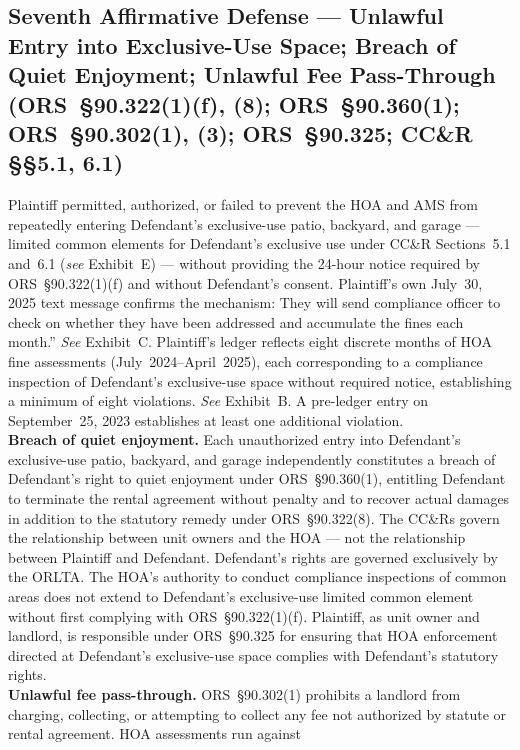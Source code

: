 \documentclass[10pt,letterpaper,oneside]{extarticle}
\begin{document}
\subsection{\textbf{Seventh Affirmative Defense ---
		Unlawful Entry into Exclusive-Use Space;
		Breach of Quiet Enjoyment;
		Unlawful Fee Pass-Through
		(ORS~\S90.322(1)(f), (8); ORS~\S90.360(1);
		ORS~\S90.302(1), (3); ORS~\S90.325;
		CC\&R \S\S5.1, 6.1)}}
Plaintiff permitted, authorized, or failed to prevent the
HOA and AMS from repeatedly entering Defendant's
exclusive-use patio, backyard, and garage --- limited common
elements for Defendant's exclusive use under CC\&R
Sections~5.1 and~6.1 (\textit{see} Exhibit~E) --- without
providing the 24-hour notice required by
ORS~\S90.322(1)(f) and without Defendant's consent.
Plaintiff's own July~30, 2025 text message confirms the
mechanism: They will send compliance officer to check on
whether they have been addressed and accumulate the fines
each month.'' \textit{See} Exhibit~C. Plaintiff's ledger
reflects eight discrete months of HOA fine assessments
(July~2024--April~2025), each corresponding to a compliance
inspection of Defendant's exclusive-use space without
required notice, establishing a minimum of eight violations.
\textit{See} Exhibit~B. A pre-ledger entry on
September~25, 2023 establishes at least one additional
violation.\\
\indent \textbf{Breach of quiet enjoyment.} Each
unauthorized entry into Defendant's exclusive-use patio,
backyard, and garage independently constitutes a breach of
Defendant's right to quiet enjoyment under
ORS~\S90.360(1), entitling Defendant to terminate the
rental agreement without penalty and to recover actual
damages in addition to the statutory remedy under
ORS~\S90.322(8). The CC\&Rs govern the relationship between
unit owners and the HOA --- not the relationship between
Plaintiff and Defendant. Defendant's rights are governed
exclusively by the ORLTA. The HOA's authority to conduct
compliance inspections of common areas does not extend to
Defendant's exclusive-use limited common element without
first complying with ORS~\S90.322(1)(f). Plaintiff, as unit
owner and landlord, is responsible under ORS~\S90.325 for
ensuring that HOA enforcement directed at Defendant's
exclusive-use space complies with Defendant's statutory
rights.\\
\indent \textbf{Unlawful fee pass-through.}
ORS~\S90.302(1) prohibits a landlord from charging,
collecting, or attempting to collect any fee not authorized
by statute or rental agreement. HOA assessments run against
\end{document}
